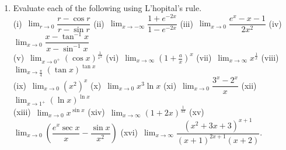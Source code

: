 \documentclass[titlepage,a4paper,12pt]{report}
\begin{document}
\begin{enumerate}
(xiii)\, $\displaystyle \lim _{x\rightarrow 0^+}(1+x)^{\frac{1}{x^2}}$ \quad (xiv)\, $\displaystyle \lim _{x\rightarrow {\frac{\pi}{2}}^+}(\sin ^2 x)^{\tan x}$ \quad (xv)\, $\displaystyle \lim _{\theta\rightarrow 0}\theta \csc 4\theta$ \quad (xvi)\, $\displaystyle \lim _{x\rightarrow 0^+}x\ln x$.
\item Evaluate each of the following using L'hopital's rule.\\
(i)\, $\displaystyle \lim _{r\rightarrow 0}\dfrac{r-\cos r}{r-\sin r}$ \quad (ii)\, $\displaystyle \lim _{x\rightarrow -\infty}\dfrac{1+e^{-2x}}{1-e^{-2x}}$ \quad (iii)\, $\displaystyle \lim _{x\rightarrow 0}\dfrac{e^x-x-1}{2x^2}$ \quad 
(iv)\, $\displaystyle \lim _{x\rightarrow 0}\dfrac{x-\tan ^{-1}x}{x-\sin ^{-1} x}$\\ (v)\, $\displaystyle \lim _{x\rightarrow 0^+}(\cos x)^{\frac{1}{x^2}}$ \quad (vi)\, $\displaystyle \lim _{x\rightarrow \infty}\left(1+\frac{a}{x}\right)^x$ \quad (vii)\, $\displaystyle \lim _{x\rightarrow \infty}x^{\frac{1}{x}}$ \quad (viii)\, $\displaystyle \lim _{x\rightarrow \frac{\pi}{4}}(\tan x)^{\tan x}$\\
(ix)\, $\displaystyle \lim _{x\rightarrow 0}(x^2)^x$ \quad (x)\, $\displaystyle \lim _{x\rightarrow 0}x^3\ln x$ \quad (xi)\, $\displaystyle \lim _{x\rightarrow 0}\dfrac{3^x-2^x}{x}$ \quad (xii)\, $\displaystyle \lim _{x\rightarrow 1^+}(\ln x)^{\ln x}$\\
(xiii)\, $\displaystyle \lim _{x\rightarrow 0}x^{\sin x}$ \quad (xiv)\, $\displaystyle \lim _{x\rightarrow \infty}(1+2x)^{\frac{1}{3x}}$ \quad (xv)\, $\displaystyle \lim _{x\rightarrow 0}\left(\dfrac{e^x\sec x}{x}-\dfrac{\sin x}{x^2}\right)$ \quad (xvi)\, $\displaystyle \lim _{x\rightarrow \infty}\dfrac{(x^2+3x+3)^{x+1}}{(x+1)^{2x+1}(x+2)}$.

\end{enumerate}
\end{document}
